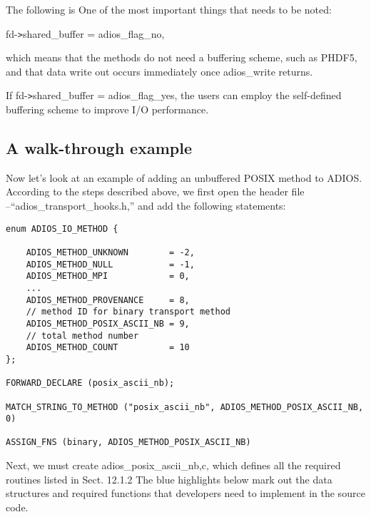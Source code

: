 The following is One of the most important things that needs to be noted: 

fd-\texttt{>}shared\_buffer = adios\_flag\_no,

which means that the methods do not need a buffering scheme, such as PHDF5, and 
that data write out occurs immediately once adios\_write returns.

If fd-\texttt{>}shared\_buffer = adios\_flag\_yes, the users can employ the self-defined 
buffering scheme to improve I/O performance.

\subsection{A walk-through example}

Now let's look at an example of adding an unbuffered POSIX method to ADIOS.  According 
to the steps described above, we first open the header file --``adios\_transport\_hooks.h,'' 
and add the following statements:

\begin{lstlisting}[emph={ADIOS_METHOD_POSIX_ASCII_NB}, emphstyle={\color{red}\large\bf},
                   caption={Example: add unbuffered POSIX method, step 1}]
enum ADIOS_IO_METHOD {

    ADIOS_METHOD_UNKNOWN        = -2,
    ADIOS_METHOD_NULL           = -1,
    ADIOS_METHOD_MPI            = 0,
    ...
    ADIOS_METHOD_PROVENANCE     = 8,
    // method ID for binary transport method
    ADIOS_METHOD_POSIX_ASCII_NB = 9, 
    // total method number
    ADIOS_METHOD_COUNT          = 10 
};

FORWARD_DECLARE (posix_ascii_nb);

MATCH_STRING_TO_METHOD ("posix_ascii_nb", ADIOS_METHOD_POSIX_ASCII_NB, 0)

ASSIGN_FNS (binary, ADIOS_METHOD_POSIX_ASCII_NB)
\end{lstlisting}

Next, we must create adios\_posix\_ascii\_nb,c, which defines all the required 
routines listed in Sect. 12.1.2 The blue highlights below mark out the data structures 
and required functions that developers need to implement in the source code. 


